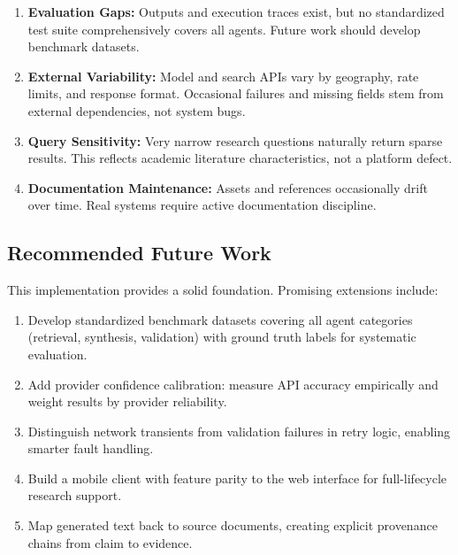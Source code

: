 \documentclass[12pt, a4paper]{article}
\begin{document}
\begin{enumerate}[label=\textbf{\alph*.}]
  \item \textbf{Evaluation Gaps:} Outputs and execution traces exist, but no standardized test suite comprehensively covers all agents. Future work should develop benchmark datasets.
  
  \item \textbf{External Variability:} Model and search APIs vary by geography, rate limits, and response format. Occasional failures and missing fields stem from external dependencies, not system bugs.
  
  \item \textbf{Query Sensitivity:} Very narrow research questions naturally return sparse results. This reflects academic literature characteristics, not a platform defect.
  
  \item \textbf{Documentation Maintenance:} Assets and references occasionally drift over time. Real systems require active documentation discipline.
\end{enumerate}

\subsection{Recommended Future Work}

This implementation provides a solid foundation. Promising extensions include:

\begin{enumerate}[label=\textbf{\alph*.}]
  \item Develop standardized benchmark datasets covering all agent categories (retrieval, synthesis, validation) with ground truth labels for systematic evaluation.
  
  \item Add provider confidence calibration: measure API accuracy empirically and weight results by provider reliability.
  
  \item Distinguish network transients from validation failures in retry logic, enabling smarter fault handling.
  
  \item Build a mobile client with feature parity to the web interface for full-lifecycle research support.
  
  \item Map generated text back to source documents, creating explicit provenance chains from claim to evidence.
\end{enumerate}
\end{document}
